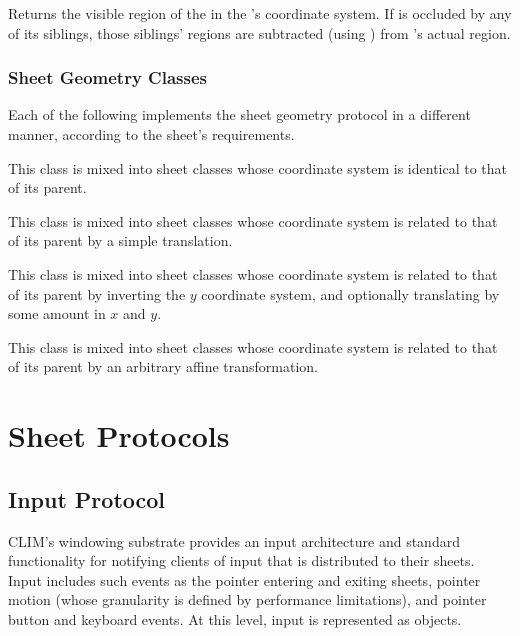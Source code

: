Returns the visible region of the   in the 
's coordinate system.  If  is occluded by any of its
siblings, those siblings' regions are subtracted (using )
from 's actual region.


\subsection {Sheet Geometry Classes}

Each of the following implements the sheet geometry protocol in a different
manner, according to the sheet's requirements.


This class is mixed into sheet classes whose coordinate system is identical to
that of its parent.


This class is mixed into sheet classes whose coordinate system is related to
that of its parent by a simple translation.


This class is mixed into sheet classes whose coordinate system is related to
that of its parent by inverting the $y$ coordinate system, and optionally
translating by some amount in $x$ and $y$.


This class is mixed into sheet classes whose coordinate system is related to
that of its parent by an arbitrary affine transformation.


\chapter {Sheet Protocols}
\label {sheet-protocols}

\section {Input Protocol}

CLIM's windowing substrate provides an input architecture and standard
functionality for notifying clients of input that is distributed to their
sheets.  Input includes such events as the pointer entering and exiting sheets,
pointer motion (whose granularity is defined by performance limitations), and
pointer button and keyboard events.  At this level, input is represented as
 objects.

